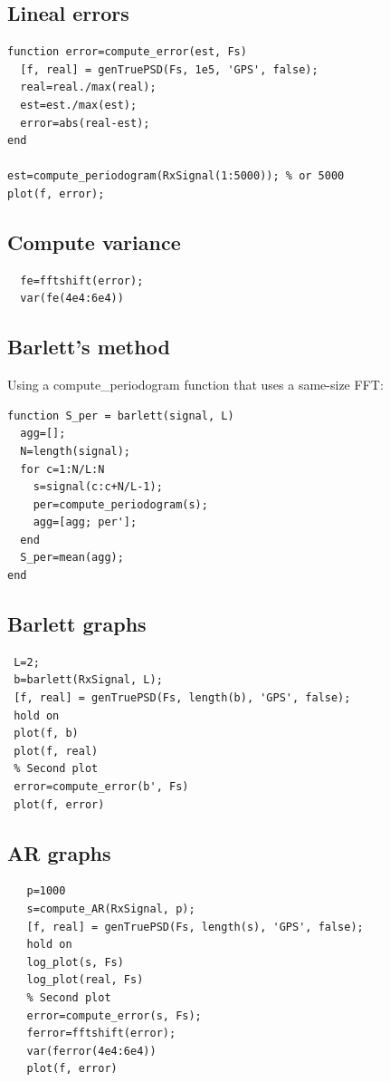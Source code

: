 \documentclass[conference,9pt]{IEEEtran}
\begin{document}
\subsection{Lineal errors}
\begin{verbatim}
function error=compute_error(est, Fs)
  [f, real] = genTruePSD(Fs, 1e5, 'GPS', false);
  real=real./max(real);
  est=est./max(est);
  error=abs(real-est);
end

est=compute_periodogram(RxSignal(1:5000)); % or 5000
plot(f, error);
\end{verbatim}

\subsection{Compute variance}
\begin{verbatim}
  fe=fftshift(error);
  var(fe(4e4:6e4))
\end{verbatim}

\subsection{Barlett's method}
Using a compute\_periodogram function that uses a same-size FFT:
\begin{verbatim}
function S_per = barlett(signal, L)
  agg=[];
  N=length(signal);
  for c=1:N/L:N
    s=signal(c:c+N/L-1);
    per=compute_periodogram(s);
    agg=[agg; per'];
  end
  S_per=mean(agg);
end
\end{verbatim}

\subsection{Barlett graphs}
\begin{verbatim}
 L=2;
 b=barlett(RxSignal, L);
 [f, real] = genTruePSD(Fs, length(b), 'GPS', false);
 hold on
 plot(f, b)
 plot(f, real)
 % Second plot
 error=compute_error(b', Fs)
 plot(f, error)
\end{verbatim}


\subsection{AR graphs}
\begin{verbatim}
   p=1000
   s=compute_AR(RxSignal, p);
   [f, real] = genTruePSD(Fs, length(s), 'GPS', false);
   hold on
   log_plot(s, Fs)
   log_plot(real, Fs)
   % Second plot
   error=compute_error(s, Fs);
   ferror=fftshift(error);
   var(ferror(4e4:6e4))
   plot(f, error)
\end{verbatim}
\end{document}
